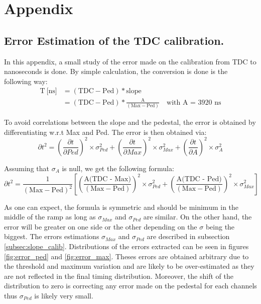\chapter{Appendix}

\section{Error Estimation of the TDC calibration.}
\label{appendix:calib_error}

In this appendix, a small study of the error made on the calibration from TDC to nanoseconds is done. By simple calculation, the conversion is done is the following way:
\begin{equation*}
\begin{split}
\text{T} \: \text{[ns]} & = ( \text{TDC} - \text{Ped} ) * \text{slope} \\
& = ( \text{TDC} - \text{Ped} ) * \frac{\text{A}}{(\text{Max} - \text{Ped})} \quad \text{with A = 3920 ns}
\end{split}
\end{equation*}

To avoid correlations between the slope and the pedestal, the error is obtained by differentiating w.r.t Max and Ped. The error is then obtained via:
\begin{equation*}
\partial t^2 = \left(\frac{\partial t}{\partial Ped}\right)^2 \times \sigma_{Ped}^2 + \left(\frac{\partial t}{\partial Max}\right)^2 \times \sigma_{Max}^2 + \left(\frac{\partial t}{\partial A}\right)^2 \times \sigma_{A}^2
\end{equation*}

Assuming that $\sigma_{A}$ is null, we get the following formula:
\begin{equation*}
\partial t^2 = \frac{1}{(\text{Max} - \text{Ped})^2} \left[ \left( \frac{\text{A(TDC - Max)}}{(\text{Max} - \text{Ped})} \right)^2 \times \sigma_{Ped}^2 + \left( \frac{\text{A(TDC - Ped)}}{(\text{Max} - \text{Ped})} \right)^2 \times \sigma_{Max}^2 \right]
\end{equation*}

As one can expect, the formula is symmetric and should be minimum in the middle of the ramp as long as $\sigma_{Max}$ and $\sigma_{Ped}$ are similar. On the other hand, the error will be greater on one side or the other depending on the $\sigma$ being the biggest. The errors estimations $\sigma_{Max}$ and $\sigma_{Ped}$ are described in subsection \ref{subsec:slope_calib}. Distributions of the errors extracted can be seen in figures \ref{fig:error_ped} and \ref{fig:error_max}. Theses errors are obtained arbitrary due to the threshold and maximum variation and are likely to be over-estimated as they are not reflected in the final timing distribution. Moreover, the shift of the distribution to zero is correcting any error made on the pedestal for each channels thus $\sigma_{Ped}$ is likely very small.


